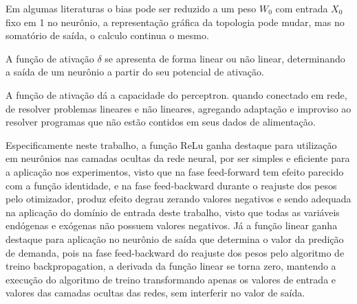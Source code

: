 		     Em algumas literaturas o bias pode ser reduzido a um peso $W_0$ com entrada $X_0$ fixo em 1 no neurônio, a representação gráfica da topologia pode mudar, mas no somatório de saída, o calculo continua o mesmo.
		
		     A função de ativação $\delta$ se apresenta de forma linear ou não linear, determinando a saída de um neurônio a partir do seu potencial de ativação. 
		
		     \begin{figure}[H]
        	 \label{fig:activation_functions}
        \end{figure}
		
		     A função de ativação dá a capacidade do perceptron. quando conectado em rede, de resolver problemas lineares e não lineares, agregando adaptação e improviso ao resolver programas que não estão contidos em seus dados de alimentação.
             
             Especificamente neste trabalho, a função ReLu ganha destaque para utilização em neurônios nas camadas ocultas da rede neural, por ser simples e eficiente para a aplicação nos experimentos, visto que na fase feed-forward tem efeito parecido com a função identidade, e na fase feed-backward durante o reajuste dos pesos pelo otimizador, produz efeito degrau zerando valores negativos e sendo adequada na aplicação do domínio de entrada deste trabalho, visto que todas as variáveis endógenas e exógenas não possuem valores negativos. Já a função linear ganha destaque para aplicação no neurônio de saída que determina o valor da predição de demanda, pois na fase feed-backward do reajuste dos pesos pelo algoritmo de treino backpropagation, a derivada da função linear se torna zero, mantendo a execução do algoritmo de treino transformando apenas os valores de entrada e valores das camadas ocultas das redes, sem interferir no valor de saída.
			
